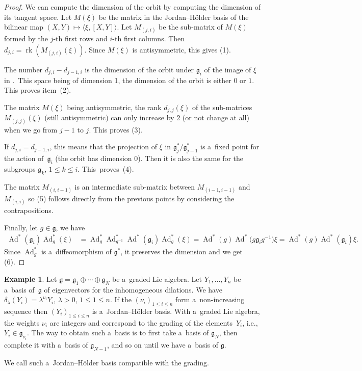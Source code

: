 \documentclass[pdftex]{sigma}
\newcommand{\Ad}{\operatorname{Ad}} %
\newcommand{\g}{\mathfrak{g}} %
\newcommand{\lag}{\langle}
\newcommand{\rag}{\rangle}
\newcommand{\rk}{\operatorname{rk}} %
\numberwithin{equation}{section}
\theoremstyle{definition}
\newtheorem{ex}[thm]{Example}
\begin{document}
\begin{proof}
 We can compute the dimension of the orbit by computing the dimension of its tangent space. Let $M(\xi)$ be the matrix in the Jordan--H\"older basis of the bilinear map
 $(X,Y) \mapsto \lag\xi,[X,Y]\rag$.
 Let $M_{(j,i)}$ be the sub-matrix of $M(\xi)$ formed by the $j$-th first rows and $i$-th first columns. Then $d_{j,i} = \rk(M_{(j,i)}(\xi))$. Since $M(\xi)$ is antisymmetric, this gives (1).

 The number $d_{j,i}-d_{j-1,i}$ is the dimension of the orbit under $\g_i$ of the image of $\xi$ in \smash{${\g_j^*}/{\g_{j-1}^*}$}.~This space being of dimension 1, the dimension of the orbit is either $0$ or $1$. This proves item~(2).

 The matrix $M(\xi)$ being antisymmetric, the rank $d_{j,j}(\xi)$ of the sub-matrices $M_{(j,j)}(\xi)$ (still antisymmetric) can only increase by $2$ (or not change at all) when we go from $j-1$ to $j$. This proves (3).

 If $d_{j,i} = d_{j-1,i}$, this means that the projection of $\xi$ in ${\g_j^*}/{\g_{j-1}^*}$ is a~fixed point for the action of~$\g_i$ (the orbit has dimension $0$). Then it is also the same for the subgroups $\g_k$, $1\leq k \leq i$. This~proves~(4).

 The matrix $M_{(i,i-1)}$ is an intermediate sub-matrix between $M_{(i-1,i-1)}$ and $M_{(i,i)}$ so (5) follows directly from the previous points by considering the contrapositions.

 Finally, let $g\in \g$, we have
 \begin{align*}
 \Ad^*(\g_i)\Ad^*_g(\xi) &= \Ad^*_g\Ad^*_{g^{-1}}\Ad^*(\g_i)\Ad^*_g(\xi) = \Ad^*(g)\Ad^*\bigl(g\g_ig^{-1}\bigr)\xi= \Ad^*(g)\Ad^*(\g_i)\xi.
 \end{align*}
 Since $\Ad^*_g$ is a~diffeomorphism of $\g^*$, it preserves the dimension and we get (6).
\end{proof}

\begin{ex}
 Let $\g = \g_1\oplus\cdots\oplus \g_N$ be a~graded Lie algebra. Let $Y_1, \dots, Y_n$ be a~basis of~$\g$ of eigenvectors for the inhomogeneous dilations. We have $\delta_{\lambda}(Y_i) = \lambda^{\nu_i}Y_i$, $\lambda>0$, $1\leq 1 \leq n$. If the $(\nu_i)_{1\leq i \leq n}$ form a~non-increasing sequence then $(Y_i)_{1\leq i \leq n}$ is a~Jordan--H\"older basis. With a~graded Lie algebra, the weights $\nu_i$ are integers and correspond to the grading of the elements~$Y_i$, i.e., $Y_i \in \g_{\nu_i}$. The way to obtain such a~basis is to first take a~basis of $\g_N$, then complete it with a~basis of $\g_{N-1}$, and so on until we have a~basis of $\g$.

 We call such a~Jordan--H\"older basis compatible with the grading.
\end{ex}
\end{document}
